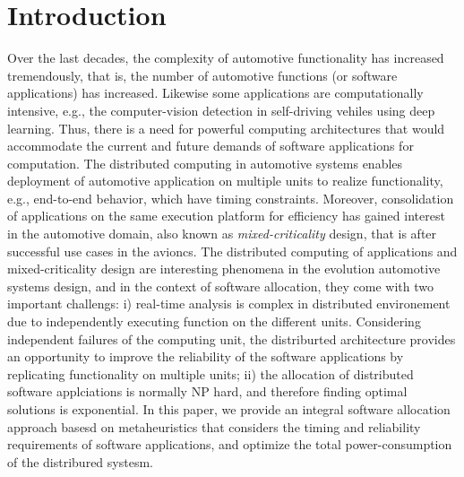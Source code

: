 \section{Introduction}
Over the last decades, the complexity of automotive functionality has increased tremendously, that is, the number of automotive functions (or software applications) has increased. Likewise some applications are computationally intensive, e.g., the computer-vision detection in self-driving vehiles using deep learning. Thus, there is a need for powerful computing architectures that would accommodate the current and future demands of software applications for computation. The distributed computing in automotive systems enables deployment of automotive application on multiple units to realize functionality, e.g., end-to-end behavior, which have timing constraints. Moreover, consolidation of applications on the same execution platform for efficiency has gained interest in the automotive domain, also known as \textit{mixed-criticality} design, that is after successful use cases in the avioncs. The distributed computing of applications and mixed-criticality design are interesting phenomena in the evolution automotive systems design, and in the context of software allocation, they come with two important challengs: i) real-time analysis is complex in distributed environement due to independently executing function on the different units. Considering independent failures of the computing unit, the distriburted architecture provides an opportunity to improve the reliability of the software applications by replicating functionality on multiple units; ii) the allocation of distributed software applciations is normally NP hard, and therefore finding optimal solutions is exponential. In this paper, we provide an integral software allocation approach basesd on metaheuristics that considers the timing and reliability requirements of software applications, and optimize the total power-consumption of the distribured systesm.

